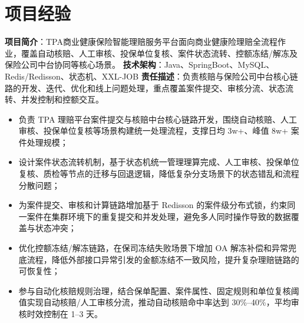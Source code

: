 \documentclass[11pt]{resume}
\begin{document}
\section{项目经验}
\newline \textbf{项目简介}：TPA商业健康保险智能理赔服务平台面向商业健康险理赔全流程作业，覆盖自动核赔、人工审核、投保单位复核、案件状态流转、控额冻结/解冻及保险公司中台协同等核心场景。
\newline \textbf{技术架构}：Java、SpringBoot、MySQL、Redis/Redisson、状态机、XXL-JOB
\newline \textbf{责任描述}：负责核赔与保险公司中台核心链路的开发、迭代、优化和线上问题处理，重点覆盖案件提交、审核分流、状态流转、并发控制和控额交互。
\begin{itemize}
    \item 负责 TPA 理赔平台案件提交与核赔中台核心链路开发，围绕自动核赔、人工审核、投保单位复核等场景构建统一处理流程，支撑日均 3w+、峰值 8w+ 案件处理规模；
    \item 设计案件状态流转机制，基于状态机统一管理理算完成、人工审核、投保单位复核、质检等节点的迁移与回退逻辑，降低复杂分支场景下的状态错乱和流程分散问题；
    \item 为案件提交、审核和计算链路增加基于 Redisson 的案件级分布式锁，约束同一案件在集群环境下的重复提交和并发处理，避免多人同时操作导致的数据覆盖与状态冲突；
    \item 优化控额冻结/解冻链路，在保司冻结失败场景下增加 OA 解冻补偿和异常兜底流程，降低外部接口异常引发的金额冻结不一致风险，提升复杂理赔链路的可恢复性；
    \item 参与自动化核赔规则治理，结合保单配置、案件属性、固定规则和单位复核阈值实现自动核赔/人工审核分流，推动自动核赔命中率达到 30\%--40\%，平均审核时效控制在 1--3 天。
\end{itemize}
\end{document}
